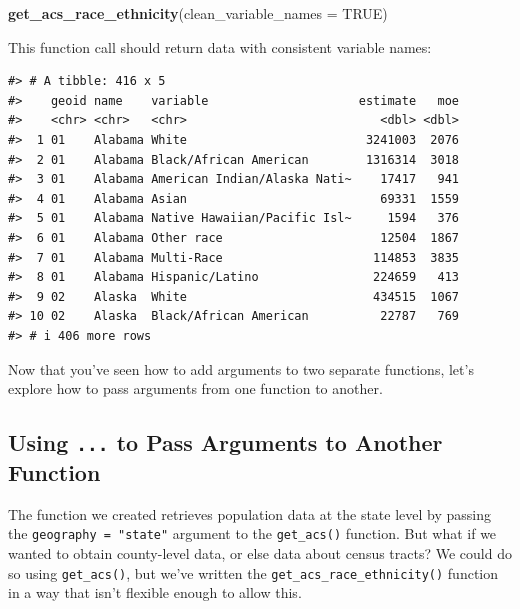 \documentclass[
]{book}
\newenvironment{Shaded}{\begin{snugshade}}{\end{snugshade}}
\newcommand{\AttributeTok}[1]{\textcolor[rgb]{0.13,0.29,0.53}{#1}}
\newcommand{\ConstantTok}[1]{\textcolor[rgb]{0.56,0.35,0.01}{#1}}
\newcommand{\FunctionTok}[1]{\textcolor[rgb]{0.13,0.29,0.53}{\textbf{#1}}}
\newcommand{\NormalTok}[1]{#1}
\begin{document}
\begin{Shaded}
\begin{Highlighting}[]
\FunctionTok{get\_acs\_race\_ethnicity}\NormalTok{(}\AttributeTok{clean\_variable\_names =} \ConstantTok{TRUE}\NormalTok{)}
\end{Highlighting}
\end{Shaded}

This function call should return data with consistent variable names:

\begin{verbatim}
#> # A tibble: 416 x 5
#>    geoid name    variable                     estimate   moe
#>    <chr> <chr>   <chr>                           <dbl> <dbl>
#>  1 01    Alabama White                         3241003  2076
#>  2 01    Alabama Black/African American        1316314  3018
#>  3 01    Alabama American Indian/Alaska Nati~    17417   941
#>  4 01    Alabama Asian                           69331  1559
#>  5 01    Alabama Native Hawaiian/Pacific Isl~     1594   376
#>  6 01    Alabama Other race                      12504  1867
#>  7 01    Alabama Multi-Race                     114853  3835
#>  8 01    Alabama Hispanic/Latino                224659   413
#>  9 02    Alaska  White                          434515  1067
#> 10 02    Alaska  Black/African American          22787   769
#> # i 406 more rows
\end{verbatim}

Now that you've seen how to add arguments to two separate functions, let's explore how to pass arguments from one function to another.

\hypertarget{using-...-to-pass-arguments-to-another-function}{%
\subsection*{\texorpdfstring{Using \texttt{...} to Pass Arguments to Another Function}{Using ... to Pass Arguments to Another Function}}\label{using-...-to-pass-arguments-to-another-function}}

The function we created retrieves population data at the state level by passing the \texttt{geography\ =\ "state"} argument to the \texttt{get\_acs()} function. But what if we wanted to obtain county-level data, or else data about census tracts? We could do so using \texttt{get\_acs()}, but we've written the \texttt{get\_acs\_race\_ethnicity()} function in a way that isn't flexible enough to allow this.
\end{document}
